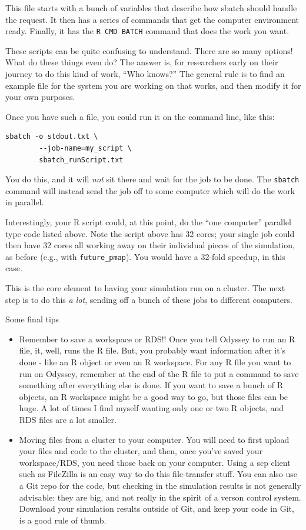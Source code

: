 \documentclass[
]{book}
\begin{document}
This file starts with a bunch of variables that describe how sbatch should handle the request.
It then has a series of commands that get the computer environment ready.
Finally, it has the \texttt{R\ CMD\ BATCH} command that does the work you want.

These scripts can be quite confusing to understand.
There are so many options!
What do these things even do?
The answer is, for researchers early on their journey to do this kind of work, ``Who knows?''
The general rule is to find an example file for the system you are working on that works, and then modify it for your own purposes.

Once you have such a file, you could run it on the command line, like this:

\begin{verbatim}
sbatch -o stdout.txt \
        --job-name=my_script \
        sbatch_runScript.txt
\end{verbatim}

You do this, and it will \emph{not} sit there and wait for the job to be done.
The \texttt{sbatch} command will instead send the job off to some computer which will do the work in parallel.

Interestingly, your R script could, at this point, do the ``one computer'' parallel type code listed above.
Note the script above has 32 cores; your single job could then have 32 cores all working away on their individual pieces of the simulation, as before (e.g., with \texttt{future\_pmap}).
You would have a 32-fold speedup, in this case.

This is the core element to having your simulation run on a cluster.
The next step is to do this \emph{a lot}, sending off a bunch of these jobs to different computers.

Some final tips

\begin{itemize}
\item
  Remember to save a workspace or RDS!! Once you tell Odyssey to run an R file, it, well, runs the R file. But, you probably want information after it's done - like an R object or even an R workspace. For any R file you want to run on Odyssey, remember at the end of the R file to put a command to save something after everything else is done. If you want to save a bunch of R objects, an R workspace might be a good way to go, but those files can be huge. A lot of times I find myself wanting only one or two R objects, and RDS files are a lot smaller.
\item
  Moving files from a cluster to your computer. You will need to first upload your files and code to the cluster, and then, once you've saved your workspace/RDS, you need those back on your computer. Using a scp client such as FileZilla is an easy way to do this file-transfer stuff. You can also use a Git repo for the code, but checking in the simulation results is not generally advisable: they are big, and not really in the spirit of a verson control system. Download your simulation results outside of Git, and keep your code in Git, is a good rule of thumb.
\end{itemize}
\end{document}
